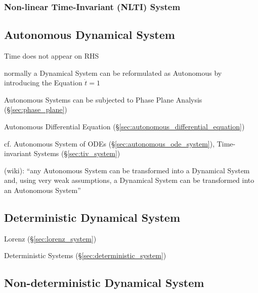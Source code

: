 \subsubsection{Non-linear Time-Invariant (NLTI) System}\label{sec:nlti_system}



\subsection{Autonomous Dynamical System}\label{sec:autonomous_dynamical_system}

Time does not appear on RHS

normally a Dynamical System can be reformulated as Autonomous by introducing
the Equation $\dot{t} = 1$

Autonomous Systems can be subjected to Phase Plane Analysis
(\S\ref{sec:phase_plane})

Autonomous Differential Equation (\S\ref{sec:autonomous_differential_equation})

cf. Autonomous System of ODEs (\S\ref{sec:autonomous_ode_system}),
Time-invariant Systems (\S\ref{sec:tiv_system})

(wiki): ``any Autonomous System can be transformed into a Dynamical System and,
using very weak assumptions, a Dynamical System can be transformed into an
Autonomous System''




\subsection{Deterministic Dynamical System}
\label{sec:deterministic_dynamical_system}

Lorenz (\S\ref{sec:lorenz_system})

\fist Deterministic Systems (\S\ref{sec:deterministic_system})



\subsection{Non-deterministic Dynamical System}
\label{sec:nondeterministic_dynamical_system}

